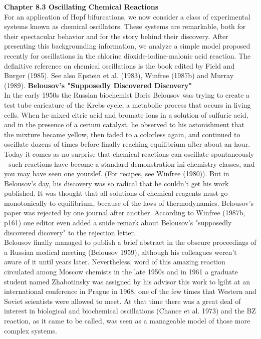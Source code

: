 \documentclass{article}
\newcommand\tab[1][1cm]{\hspace*{#1}}
\begin{document}
\textbf {Chapter 8.3 Oscillating Chemical Reactions} \\
For an application of Hopf bifurcations, we now consider a class of experimental systems known as chemical oscillators. These systems are remarkable, both for their spectacular behavior and for the story behind their discovery. After presenting this backgrounding information, we analyze a simple model proposed recently for oscillations in the chlorine dioxide-iodine-malonic acid reaction. The definitive reference on chemical oscillations is the book edited by Field and Burger (1985). See also Epstein et al. (1983), Winfree (1987b) and Murray (1989). 
\textbf {Belousov's "Supposedly Discovered Discovery"} \\ \tab
In the early 1950s the Russian biochemist Boris Belousov was trying to create a test tube caricature of the Krebs cycle, a metabolic process that occurs in living cells. When he mixed citric acid and bromate ions in a solution of sulfuric acid, and in the presence of a cerium catalyst, he observed to his astonishment that the mixture became yellow, then faded to a colorless again, and continued to oscillate dozens of times before finally reaching equilibrium after about an hour. \\ \tab
Today it comes as no surprise that chemical reactions can oscillate spontaneously - such reactions have become a standard demonstration ini chemistry classes, and you may have seen one yourslef. (For recipes, see Winfree (1980)). But in Belousov's day, his discovery was so radical that he couldn't get his work published. It was thought that all solutions of chemical reagents must go monotonically to equilibrium, because of the laws of thermodynamics. Belousov's paper was rejected by one journal after another. According to Winfree (1987b, p161) one editor even added a snide remark about Belousov's "supposedly discovered dicovery" to the rejection letter. \\ \tab
Belousov finally managed to publish a brief abstract in the obscure proceedings of a Russian medical meeting (Belousov 1959), although his colleagues weren't aware of it until years later. Nevertheless, word of this amazing reaction circulated among Moscow chemists in the late 1950s and in 1961 a graduate student named Zhabotinsky was assigned by his advisor this work to lgiht at an international conference in Prague in 1968, one of the few times that Western and Soviet scientists were allowed to meet. At that time there was a great deal of interest in biological and biochemical oscillations (Chance et al. 1973) and the BZ reaction, as it came to be called, was seen as a manageable model of those more complex systems. \\ \tab
\end{document}
